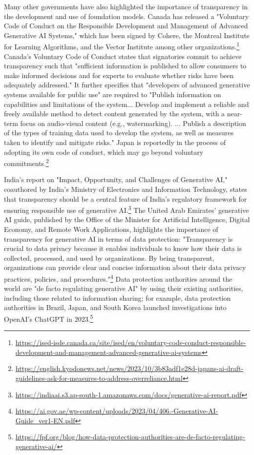 Many other governments have also highlighted the importance of transparency in the development and use of foundation models. 
Canada has released a "Voluntary Code of Conduct on the Responsible Development and Management of Advanced Generative AI Systems," which has been signed by Cohere, the Montreal Institute for Learning Algorithms, and the Vector Institute among other organizations.\footnote{\url{https://ised-isde.canada.ca/site/ised/en/voluntary-code-conduct-responsible-development-and-management-advanced-generative-ai-systems}} 
Canada's Voluntary Code of Conduct states that signatories commit to achieve transparency such that "sufficient information is published to allow consumers to make informed decisions and for experts to evaluate whether risks have been adequately addressed."
It further specifies that "developers of advanced generative systems available for public use" are required to "Publish information on capabilities and limitations of the system... Develop and implement a reliable and freely available method to detect content generated by the system, with a near-term focus on audio-visual content (e.g., watermarking). ... Publish a description of the types of training data used to develop the system, as well as measures taken to identify and mitigate risks." Japan is reportedly in the process of adopting its own code of conduct, which may go beyond voluntary commitments.\footnote{\url{https://english.kyodonews.net/news/2023/10/3b83adf1e28d-japans-ai-draft-guidelines-ask-for-measures-to-address-overreliance.html}}

India's report on "Impact, Opportunity, and Challenges of Generative AI," coauthored by India's Ministry of Electronics and Information Technology, states that transparency should be a central feature of India's regulatory framework for ensuring responsible use of generative AI.\footnote{\url{https://indiaai.s3.ap-south-1.amazonaws.com/docs/generative-ai-report.pdf}} The United Arab Emirates' generative AI guide, published by the Office of the Minister for Artificial Intelligence, Digital Economy, and Remote Work Applications,  highlights the importance of transparency for generative AI in terms of data protection: "Transparency is crucial to data privacy because it enables individuals to know how their data is collected, processed, and used by organizations. By being transparent, organizations can provide clear and concise information about their data privacy practices, policies, and procedures."\footnote{\url{https://ai.gov.ae/wp-content/uploads/2023/04/406.-Generative-AI-Guide_ver1-EN.pdf}} Data protection authorities around the world are "de facto regulating generative AI" by using their existing authorities, including those related to information sharing; for example, data protection authorities in Brazil, Japan, and South Korea launched investigations into OpenAI's ChatGPT in 2023.\footnote{\url{https://fpf.org/blog/how-data-protection-authorities-are-de-facto-regulating-generative-ai/}}

